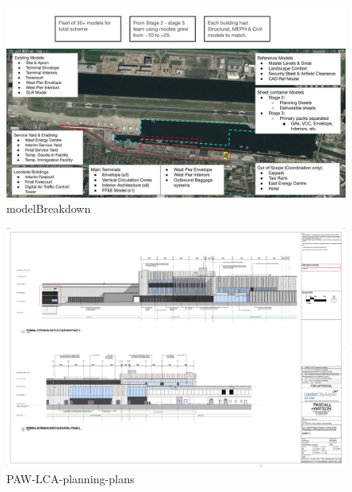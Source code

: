 \documentclass[
]{article}
\begin{document}
\begin{figure}[H]

{\centering \includegraphics{assets/PAW/LCY-modelBreakdown.jpg}

}

\caption{modelBreakdown}

\end{figure}%
\begin{figure}[H]

{\centering \includegraphics{assets/PAW/Proposed-Phase-2-Extension-Elevations.png}

}

\caption{PAW-LCA-planning-plans}

\end{figure}%
\end{document}
